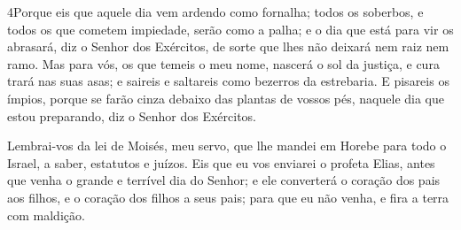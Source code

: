 \medskip

\lettrine{4} Porque eis que aquele dia vem ardendo como
fornalha; todos os soberbos, e todos os que cometem impiedade, serão
como a palha; e o dia que está para vir os abrasará, diz o Senhor
dos Exércitos, de sorte que lhes não deixará nem raiz nem ramo.
Mas para vós, os que temeis o meu nome, nascerá o sol da
justiça, e cura trará nas suas asas; e saireis e saltareis como
bezerros da estrebaria. E pisareis os ímpios, porque se farão
cinza debaixo das plantas de vossos pés, naquele dia que estou
preparando, diz o Senhor dos Exércitos.

Lembrai-vos da lei de Moisés, meu servo, que lhe mandei em Horebe
para todo o Israel, a saber, estatutos e juízos. Eis que eu vos
enviarei o profeta Elias, antes que venha o grande e terrível dia do
Senhor; e ele converterá o coração dos pais aos filhos, e o
coração dos filhos a seus pais; para que eu não venha, e fira a
terra com maldição.

